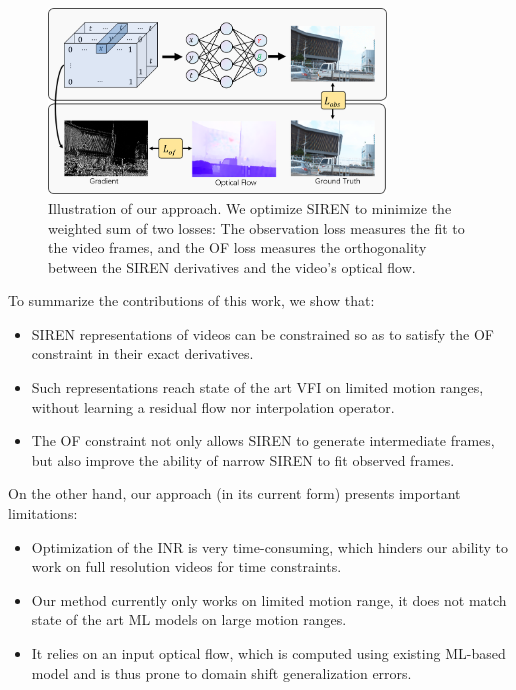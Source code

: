 \documentclass{article}
\begin{document}
\begin{figure}[h]
\centering
\includegraphics[width=0.8\textwidth]{Method}
\caption{Illustration of our approach.
We optimize SIREN to minimize the weighted sum of two losses:
The observation loss measures the fit to the video frames,
and the OF loss measures the orthogonality
between the SIREN derivatives and the video's optical flow.}
\end{figure}

To summarize the contributions of this work, we show that:
\begin{itemize}
\item SIREN representations of videos can be constrained so as to satisfy the OF constraint in their exact derivatives.
\item Such representations reach state of the art VFI on limited motion ranges, without learning a residual flow nor interpolation operator.
\item The OF constraint not only allows SIREN to generate intermediate frames, but also improve the ability of narrow SIREN to fit observed frames.
\end{itemize}

On the other hand, our approach (in its current form) presents important limitations:

\begin{itemize}
\item Optimization of the INR is very time-consuming, which hinders our ability to work on full resolution videos for time constraints.
\item Our method currently only works on limited motion range, it does not match state of the art ML models on large motion ranges.
\item It relies on an input optical flow, which is computed using existing ML-based model and is thus prone to domain shift generalization errors.
\end{itemize}
\end{document}
